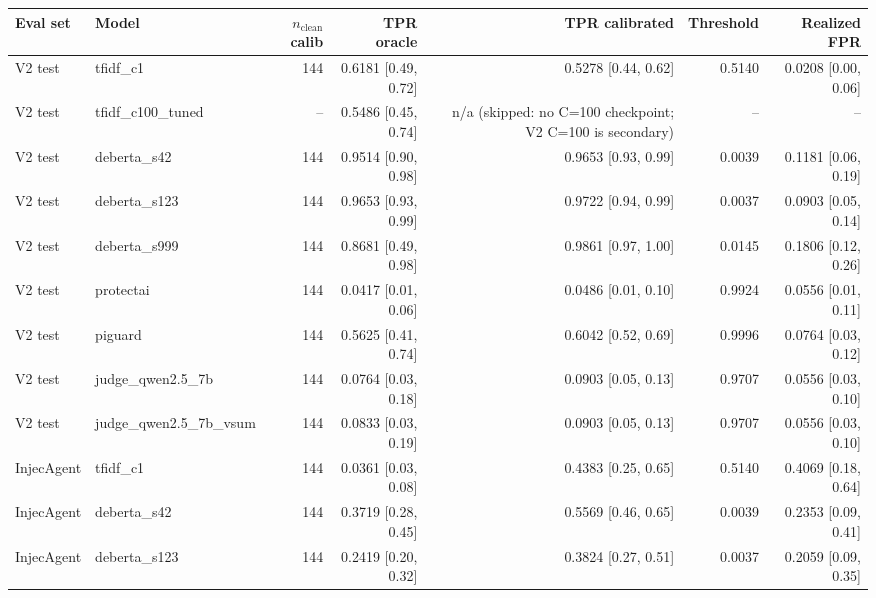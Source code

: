 \begin{tabular}{llrrrrr}
\toprule
\textbf{Eval set} & \textbf{Model} & \textbf{$n_\text{clean}$ calib} & \textbf{TPR oracle} & \textbf{TPR calibrated} & \textbf{Threshold} & \textbf{Realized FPR} \\
\midrule
V2 test & tfidf\_c1 & 144 & 0.6181 {\scriptsize[0.49, 0.72]} & 0.5278 {\scriptsize[0.44, 0.62]} & 0.5140 & 0.0208 {\scriptsize[0.00, 0.06]} \\
V2 test & tfidf\_c100\_tuned & -- & 0.5486 {\scriptsize[0.45, 0.74]} & n/a (skipped: no C=100 checkpoint; V2 C=100 is secondary) & -- & -- \\
V2 test & deberta\_s42 & 144 & 0.9514 {\scriptsize[0.90, 0.98]} & 0.9653 {\scriptsize[0.93, 0.99]} & 0.0039 & 0.1181 {\scriptsize[0.06, 0.19]} \\
V2 test & deberta\_s123 & 144 & 0.9653 {\scriptsize[0.93, 0.99]} & 0.9722 {\scriptsize[0.94, 0.99]} & 0.0037 & 0.0903 {\scriptsize[0.05, 0.14]} \\
V2 test & deberta\_s999 & 144 & 0.8681 {\scriptsize[0.49, 0.98]} & 0.9861 {\scriptsize[0.97, 1.00]} & 0.0145 & 0.1806 {\scriptsize[0.12, 0.26]} \\
V2 test & protectai & 144 & 0.0417 {\scriptsize[0.01, 0.06]} & 0.0486 {\scriptsize[0.01, 0.10]} & 0.9924 & 0.0556 {\scriptsize[0.01, 0.11]} \\
V2 test & piguard & 144 & 0.5625 {\scriptsize[0.41, 0.74]} & 0.6042 {\scriptsize[0.52, 0.69]} & 0.9996 & 0.0764 {\scriptsize[0.03, 0.12]} \\
V2 test & judge\_qwen2.5\_7b & 144 & 0.0764 {\scriptsize[0.03, 0.18]} & 0.0903 {\scriptsize[0.05, 0.13]} & 0.9707 & 0.0556 {\scriptsize[0.03, 0.10]} \\
V2 test & judge\_qwen2.5\_7b\_vsum & 144 & 0.0833 {\scriptsize[0.03, 0.19]} & 0.0903 {\scriptsize[0.05, 0.13]} & 0.9707 & 0.0556 {\scriptsize[0.03, 0.10]} \\
InjecAgent & tfidf\_c1 & 144 & 0.0361 {\scriptsize[0.03, 0.08]} & 0.4383 {\scriptsize[0.25, 0.65]} & 0.5140 & 0.4069 {\scriptsize[0.18, 0.64]} \\
InjecAgent & deberta\_s42 & 144 & 0.3719 {\scriptsize[0.28, 0.45]} & 0.5569 {\scriptsize[0.46, 0.65]} & 0.0039 & 0.2353 {\scriptsize[0.09, 0.41]} \\
InjecAgent & deberta\_s123 & 144 & 0.2419 {\scriptsize[0.20, 0.32]} & 0.3824 {\scriptsize[0.27, 0.51]} & 0.0037 & 0.2059 {\scriptsize[0.09, 0.35]} \\

\end{tabular}
